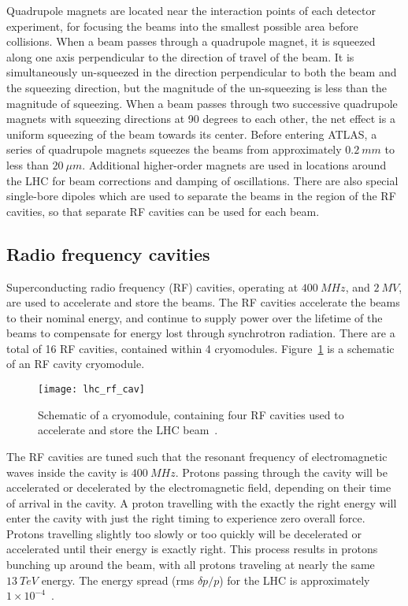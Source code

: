 Quadrupole magnets are located near the interaction points of each detector experiment,
for focusing the beams into the smallest possible area before collisions.
When a beam passes through a quadrupole magnet, it is squeezed along one axis perpendicular to the direction of travel of the beam.
It is simultaneously un-squeezed in the direction perpendicular to both the beam and the squeezing direction,
but the magnitude of the un-squeezing is less than the magnitude of squeezing.
When a beam passes through two successive quadrupole magnets with squeezing directions at 90 degrees to each other,
the net effect is a uniform squeezing of the beam towards its center.
Before entering ATLAS, a series of quadrupole magnets squeezes the beams from approximately $0.2~mm$ to less than $20~\mu m$.
Additional higher-order magnets are used in locations around the LHC for beam corrections and damping of oscillations.
There are also special single-bore dipoles which are used to separate the beams in the region of the RF cavities,
so that separate RF cavities can be used for each beam.

\subsection{Radio frequency cavities}\label{subsec:lhc_rf}

Superconducting radio frequency (RF) cavities, operating at $400~MHz$, and $2~MV$, are used to accelerate and store the beams.
The RF cavities accelerate the beams to their nominal energy,
and continue to supply power over the lifetime of the beams to compensate for energy lost through synchrotron radiation.
There are a total of 16 RF cavities, contained within 4 cryomodules.
Figure~\ref{fig:rf_cryo} is a schematic of an RF cavity cryomodule.

\begin{figure}[!ht]\centering
\texttt{[image: lhc\_rf\_cav]}
\caption{Schematic of a cryomodule, containing four RF cavities used to accelerate and store the LHC beam~\cite{lhc-machine-2008}.}
\label{fig:rf_cryo}
\end{figure}
The RF cavities are tuned such that the resonant frequency of electromagnetic waves inside the cavity is $400~MHz$.
Protons passing through the cavity will be accelerated or decelerated by the electromagnetic field,
depending on their time of arrival in the cavity.
A proton travelling with the exactly the right energy will enter the cavity with just the right timing to experience zero overall force.
Protons travelling slightly too slowly or too quickly will be decelerated or accelerated until their energy is exactly right.
This process results in protons bunching up around the beam, with all protons traveling at nearly the same $13~TeV$ energy.
The energy spread (rms $\delta p/p$) for the LHC is approximately $1\times 10^{-4}$~\cite{sm-pdg-dark-matter}.

